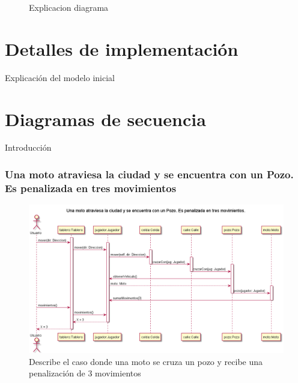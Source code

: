 \documentclass[titlepage,a4paper]{article}
\begin{document}
\begin{figure}[H]
\centering
\caption{\label{fig:class01}Explicacion diagrama}
\end{figure}

\section{Detalles de implementación}\label{sec:implementacion}

Explicación del modelo inicial





\section{Diagramas de secuencia}\label{sec:diagramasdesecuencia}

Introducción


\subsubsection[]{Una moto atraviesa la ciudad y se encuentra con un Pozo. Es penalizada en tres movimientos}

\begin{figure}[H]
  \centering
  \includegraphics[width=1\textwidth]{diagramas/SecuenciaUnaMotoCruzaUnPozoYEsPenalizado.png}
  \caption{\label{fig:class01}Describe el caso donde una moto se cruza un pozo y recibe una penalización de 3 movimientos}
\end{figure}
\end{document}
